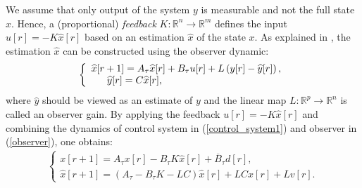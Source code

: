 \documentclass{amsart}
\numberwithin{equation}{section}
\newcommand{\R}{{\mathbb{R}}}
\begin{document}
We assume that only output of the system $y$ is measurable and not the full state $x$. 
Hence, a (proportional) {\em feedback} $K:\R^n\rightarrow\R^m$ defines the input $u[r]=-K\widehat{x}[r]$ based on an estimation $\widehat{x}$ of the state $x$. 
As explained in \cite{joao}, the estimation $\widehat{x}$ can be constructed using the observer dynamic:
\begin{equation}\label{observer}
\left\{\begin{array}{l}\widehat{x}[r+1]=A_\tau\widehat{x}[r]+B_\tau{u}[r]+L\left(y[r]-\widehat{y}[r]\right),\\
\hspace{5.6mm}\widehat{y}[r]=C\widehat{x}[r],\end{array}\right.
\end{equation}
where $\widehat{y}$ should be viewed as an estimate of $y$ and the linear map $L:\R^p\rightarrow\R^n$ is called an observer gain. 
By applying the feedback $u[r]=-K\widehat{x}[r]$ and combining the dynamics of control system in (\ref{control_system1}) and 
observer in (\ref{observer}), one obtains:
\begin{align}\label{overall0}
\left\{\begin{array}{l}x[r+1]=A_\tau x[r]-B_\tau K\widehat{x}[r]+\overline{B}_\tau d[r],\\\widehat{x}[r+1]=(A_\tau-B_\tau K-LC)\widehat{x}[r]+LCx[r]+Lv[r].\end{array}\right.
\end{align}
\end{document}
